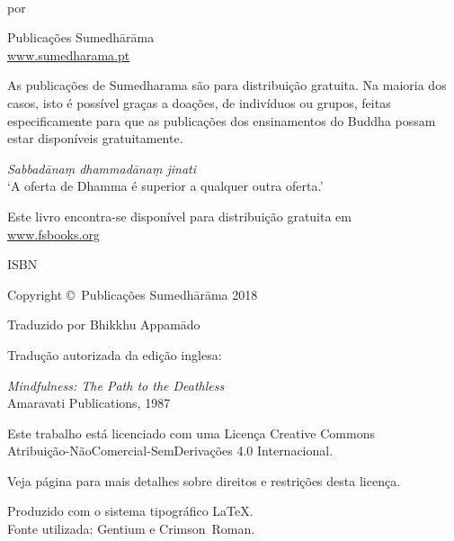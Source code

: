 \cleartoverso
\thispagestyle{empty}

{\copyrightsize
\centering
\setlength{\parindent}{0pt}%
\setlength{\parskip}{0.8\baselineskip}%

\thetitle\\
por \theauthor

Publicações Sumedhārāma\\
\href{http://sumedharama.pt}{www.sumedharama.pt}

As publicações de Sumedharama são para distribuição gratuita. Na maioria
dos casos, isto é possível graças a doações, de indivíduos ou grupos,
feitas especificamente para que as publicações dos ensinamentos do
Buddha possam estar disponíveis gratuitamente.

\textit{Sabbadānaṃ dhammadānaṃ jinati}\\
`A oferta de Dhamma é superior a qualquer outra oferta.'

Este livro encontra-se disponível para distribuição gratuita em\\
\href{http://fsbooks.org/}{www.fsbooks.org}

ISBN \theISBN

Copyright \copyright\ Publicações Sumedhārāma 2018

Traduzido por Bhikkhu Appamādo

Tradução autorizada da edição inglesa:

\emph{Mindfulness: The Path to the Deathless}\\
Amaravati Publications, 1987

\vfill

{\footnotesize

Este trabalho está licenciado com uma Licença Creative Commons\\
Atribuição-NãoComercial-SemDerivações 4.0 Internacional.

Veja página \pageref{copyright-details} para mais detalhes sobre direitos e restrições desta licença.

Produzido com o sistema tipográfico \LaTeX.\\
Fonte utilizada: Gentium e Crimson~Roman.

\theEditionInfo

}}
